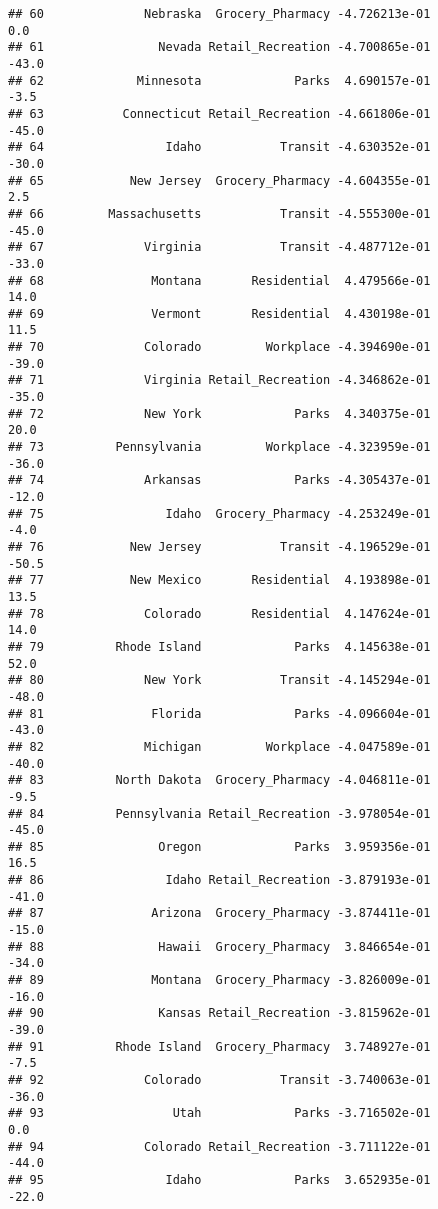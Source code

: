 \documentclass[]{article}
\begin{document}
\begin{verbatim}
## 60              Nebraska  Grocery_Pharmacy -4.726213e-01           0.0
## 61                Nevada Retail_Recreation -4.700865e-01         -43.0
## 62             Minnesota             Parks  4.690157e-01          -3.5
## 63           Connecticut Retail_Recreation -4.661806e-01         -45.0
## 64                 Idaho           Transit -4.630352e-01         -30.0
## 65            New Jersey  Grocery_Pharmacy -4.604355e-01           2.5
## 66         Massachusetts           Transit -4.555300e-01         -45.0
## 67              Virginia           Transit -4.487712e-01         -33.0
## 68               Montana       Residential  4.479566e-01          14.0
## 69               Vermont       Residential  4.430198e-01          11.5
## 70              Colorado         Workplace -4.394690e-01         -39.0
## 71              Virginia Retail_Recreation -4.346862e-01         -35.0
## 72              New York             Parks  4.340375e-01          20.0
## 73          Pennsylvania         Workplace -4.323959e-01         -36.0
## 74              Arkansas             Parks -4.305437e-01         -12.0
## 75                 Idaho  Grocery_Pharmacy -4.253249e-01          -4.0
## 76            New Jersey           Transit -4.196529e-01         -50.5
## 77            New Mexico       Residential  4.193898e-01          13.5
## 78              Colorado       Residential  4.147624e-01          14.0
## 79          Rhode Island             Parks  4.145638e-01          52.0
## 80              New York           Transit -4.145294e-01         -48.0
## 81               Florida             Parks -4.096604e-01         -43.0
## 82              Michigan         Workplace -4.047589e-01         -40.0
## 83          North Dakota  Grocery_Pharmacy -4.046811e-01          -9.5
## 84          Pennsylvania Retail_Recreation -3.978054e-01         -45.0
## 85                Oregon             Parks  3.959356e-01          16.5
## 86                 Idaho Retail_Recreation -3.879193e-01         -41.0
## 87               Arizona  Grocery_Pharmacy -3.874411e-01         -15.0
## 88                Hawaii  Grocery_Pharmacy  3.846654e-01         -34.0
## 89               Montana  Grocery_Pharmacy -3.826009e-01         -16.0
## 90                Kansas Retail_Recreation -3.815962e-01         -39.0
## 91          Rhode Island  Grocery_Pharmacy  3.748927e-01          -7.5
## 92              Colorado           Transit -3.740063e-01         -36.0
## 93                  Utah             Parks -3.716502e-01           0.0
## 94              Colorado Retail_Recreation -3.711122e-01         -44.0
## 95                 Idaho             Parks  3.652935e-01         -22.0

\end{verbatim}
\end{document}
